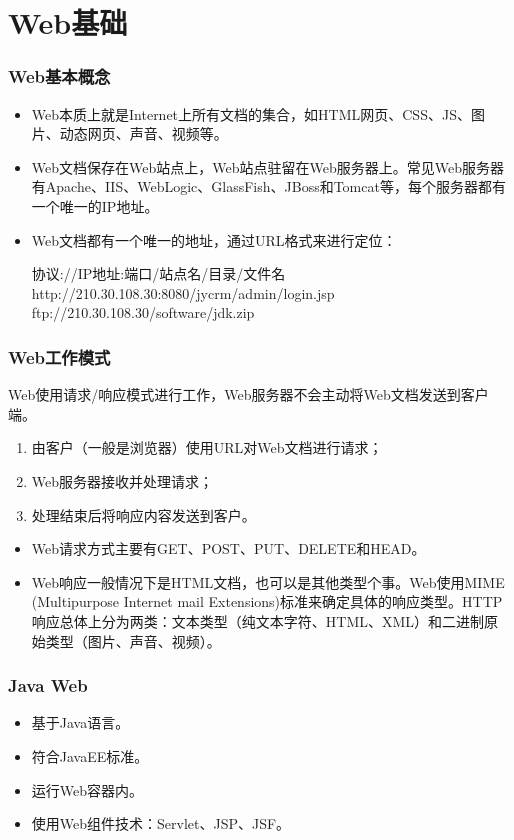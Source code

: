 \section{Web基础}

\begin{frame}
\frametitle{Web基本概念} 

\begin{itemize}
\item Web本质上就是Internet上所有文档的集合，如HTML网页、CSS、JS、图片、动态网页、声音、视频等。
\item Web文档保存在Web站点上，Web站点驻留在Web服务器上。常见Web服务器有Apache、IIS、WebLogic、GlassFish、JBoss和Tomcat等，每个服务器都有一个唯一的IP地址。
\item Web文档都有一个唯一的地址，通过URL格式来进行定位：
\begin{center}
\Blue\kai 协议://IP地址:端口/站点名/目录/文件名 \\
\Red http://210.30.108.30:8080/jycrm/admin/login.jsp\\
ftp://210.30.108.30/software/jdk.zip\\
\end{center}
\end{itemize}
\end{frame}

\begin{frame}
\frametitle{Web工作模式} 

Web使用请求/响应模式进行工作，Web服务器不会主动将Web文档发送到客户端。

\begin{enumerate}\kai
\item 由客户（一般是浏览器）使用URL对Web文档进行请求；
\item Web服务器接收并处理请求；
\item 处理结束后将响应内容发送到客户。
\end{enumerate}

\begin{itemize}
\item Web请求方式主要有{\Red GET、POST}、PUT、DELETE和HEAD。
\item Web响应一般情况下是HTML文档，也可以是其他类型个事。Web使用MIME (Multipurpose Internet mail Extensions)标准来确定具体的响应类型。HTTP响应总体上分为两类：文本类型（纯文本字符、HTML、XML）和二进制原始类型（图片、声音、视频）。
\end{itemize}
\end{frame}

\begin{frame}
\frametitle{Java Web} 
\begin{itemize}
\item 基于Java语言。
\item 符合JavaEE标准。
\item 运行Web容器内。
\item 使用Web组件技术：Servlet、JSP、JSF。
\end{itemize}
\end{frame}

